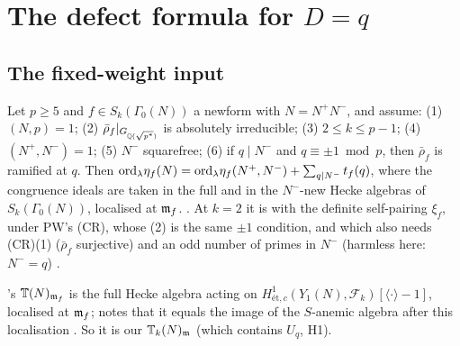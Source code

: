 \section{The defect formula for \texorpdfstring{$D=q$}{D=q}}

\subsection{The fixed-weight input}
\begin{theorem}\label{thm:s06-KO}
Let $p\ge5$ and $f\in S_k(\Gamma_0(N))$ a newform with $N=N^+N^-$, and assume: (1) $(N,p)=1$; (2) $\bar\rho_f|_{G_{\mathbb{Q}(\sqrt{p^*})}}$
is absolutely irreducible; (3) $2\le k\le p-1$; (4) $(N^+,N^-)=1$; (5) $N^-$ squarefree; (6) if $q\mid N^-$ and $q\equiv\pm1\bmod p$,
then $\bar\rho_f$ is ramified at $q$. Then $\mathrm{ord}_\lambda\eta_f(N)=\mathrm{ord}_\lambda\eta_f(N^+,N^-)+\sum_{q\mid N^-}t_f(q)$, where the
congruence ideals are taken in the full and in the $N^-$-new Hecke algebras of $S_k(\Gamma_0(N))$, localised at $\mathfrak{m}_f$.
\stcited{} \cite[Thm~1.1]{KO}
. At $k=2$ it is \cite[Thm~6.8]{PW}
 with the definite self-pairing
$\xi_f$, under PW's (CR), whose (2) is the same $\pm1$ condition, and which also needs (CR)(1) ($\bar\rho_f$ surjective) and an odd number of primes in $N^-$ (harmless here: $N^-=q$) .
\end{theorem}
\noindent \cite{KO}'s $\mathbb{T}(N)_{\mathfrak{m}_f}$ is the full Hecke algebra acting on $H^1_{\text{ét},c}(Y_1(N),\mathcal F_k)[\langle\cdot\rangle-1]$,
localised at $\mathfrak{m}_f$; \cite[\S2.1.3, p.~5]{KO} notes that it equals the image of the $S$-anemic algebra after this localisation
.
So it is our $\mathbb{T}_k(N)_{\mathfrak{m}}$ (which contains $U_q$, H1).

